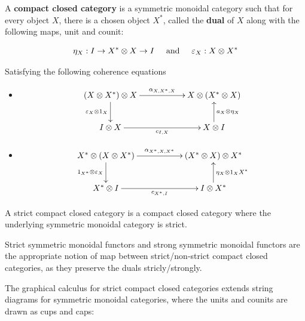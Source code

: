 \begin{definition}
A {\bf compact closed category} is a symmetric monoidal category such that for every object $X$, there is a chosen object $X^*$, called the {\bf dual} of $X$ along with the following maps, unit and counit:

$$
\eta_X:I\to X^* \otimes X\to I \hspace*{.5cm}\text{and}\hspace*{.5cm} \epsilon_X:X\otimes X^*
$$

Satisfying the following coherence equations

\begin{itemize}
\item
$$
\xymatrix{
  (X\otimes X^*)\otimes X \ar[rr]^{\alpha_{X,X^*,X}}  \ar[d]_{\epsilon_X\otimes 1_X}
    & 
    & X\otimes(X^*\otimes X)
  \\I\otimes X \ar[rr]_{c_{I,X}}
    &
    & X\otimes I \ar[u]_{a_X\otimes \eta_X}
}
$$

\item

$$
\xymatrix{
  X^*\otimes ( X\otimes X^*) \ar[rr]^{\alpha_{X^*,X,X^*}}  \ar[d]_{1_{X^*}\otimes \epsilon_X}
    & 
    & (X^* \otimes X)\otimes X^*
  \\X^*\otimes I \ar[rr]_{c_{X^*,I}}
    &
    & I\otimes X^* \ar[u]_{\eta_X\otimes 1_X{X^*}}
}
$$
\end{itemize}


A strict compact closed category is a compact closed category where the underlying symmetric monoidal category is strict.

Strict symmetric monoidal functors and strong symmetric monoidal functors are the appropriate notion of map between strict/non-strict compact closed categories, as they preserve the duals stricly/strongly.
\end{definition}

The graphical calculus for strict compact closed categories extends string diagrams for symmetric monoidal categories, where  the units and counits are drawn as cups and caps:

